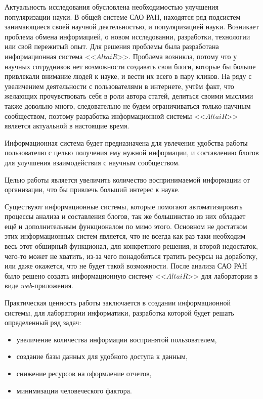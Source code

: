 Актуальность исследования обусловлена необходимостью улучшения популяризации науки. В общей системе САО РАН, находятся ряд подсистем занимающиеся своей научной деятельностью, и популяризацией науки. Возникает проблема обмена информацией, о новом исследовании, разработки, технологии или свой пережитый опыт. Для решения проблемы была разработана информационная система <<$AltaiR$>>. Проблема возникла, потому что у научных сотрудников нет возможности создавать свои блоги, которые бы больше привлекали внимание людей к науке, и вести их всего в пару кликов. На ряду с увеличением деятельности с пользователями в интернете, учтём факт, что желающих прочувствовать себя в роли автора статей, делиться своими мыслями также довольно много, следовательно не будем ограничиваться только научным сообществом, поэтому разработка информационной системы <<$AltaiR$>> является актуальной в настоящие время.

Информационная система будет предназначена для увлечения удобства работы пользователю с целью получения ему нужной информации, и составлению блогов для улучшения взаимодействия с научным сообществом.

Целью работы является увеличить количество воспринимаемой информации от организации, что бы привлечь больший интерес к науке. 

Существуют информационные системы, которые помогают автоматизировать процессы анализа и составления блогов, так же большинство из них обладает ещё и дополнительным функционалом по мимо этого. Основном не достатком этих информационных систем является, что не всегда как раз таки необходим весь этот обширный функционал, для конкретного решения, и второй недостаток, чего-то может не хватить, из-за чего понадобиться тратить ресурсы на доработку, или даже окажется, что не будет такой возможности. После анализа САО РАН было решено создать информационную систему <<$AltaiR$>> для лаборатории в виде $web$-приложения.

Практическая ценность работы заключается в создании информационной системы, для лаборатории информатики, разработка которой будет решать определенный ряд задач:
\begin{itemize}
	\item увеличение количества информации воспринятой пользователем,
	\item создание базы данных для удобного доступа к данным,
	\item снижение ресурсов на оформление отчетов,
	\item минимизации человеческого фактора.
\end{itemize}


